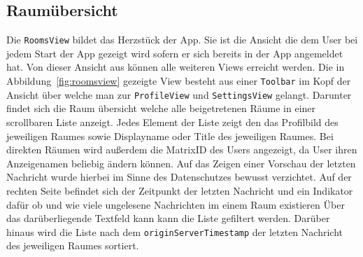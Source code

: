    \newpage
    \subsection{Raumübersicht}\label{subsec:raumubersicht}

    Die \texttt{RoomsView} bildet das Herzstück der App.
    Sie ist die Ansicht die dem User bei jedem Start der App gezeigt wird sofern er sich bereits in der App angemeldet hat.
    Von dieser Ansicht aus können alle weiteren Views erreicht werden.
    Die in Abbildung~\ref{fig:roomsview} gezeigte View besteht aus einer \texttt{Toolbar} im Kopf der Ansicht über welche man zur \texttt{ProfileView} und \texttt{SettingsView} gelangt.
    Darunter findet sich die Raum übersicht welche alle beigetretenen Räume in einer scrollbaren Liste anzeigt.
    Jedes Element der Liste zeigt den das Profilbild des jeweiligen Raumes sowie Displayname oder Title des jeweiligen Raumes.
    Bei direkten Räumen wird außerdem die MatrixID des Users angezeigt, da User ihren Anzeigenamen beliebig ändern können.
    Auf das Zeigen einer Vorschau der letzten Nachricht wurde hierbei im Sinne des Datenschutzes bewusst verzichtet.
    Auf der rechten Seite befindet sich der Zeitpunkt der letzten Nachricht und ein Indikator dafür ob und wie viele ungelesene Nachrichten im einem Raum existieren
    Über das darüberliegende Textfeld kann kann die Liste gefiltert werden.
    Darüber hinaus wird die Liste nach dem  \texttt{originServerTimestamp} der letzten Nachricht des jeweiligen Raumes sortiert.

